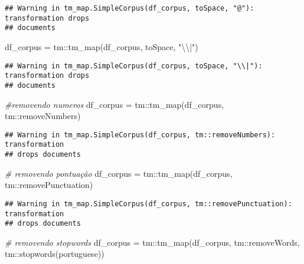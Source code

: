 \documentclass[
]{article}
\newenvironment{Shaded}{\begin{snugshade}}{\end{snugshade}}
\newcommand{\CommentTok}[1]{\textcolor[rgb]{0.56,0.35,0.01}{\textit{#1}}}
\newcommand{\FunctionTok}[1]{\textcolor[rgb]{0.00,0.00,0.00}{#1}}
\newcommand{\NormalTok}[1]{#1}
\newcommand{\OtherTok}[1]{\textcolor[rgb]{0.56,0.35,0.01}{#1}}
\newcommand{\SpecialCharTok}[1]{\textcolor[rgb]{0.00,0.00,0.00}{#1}}
\newcommand{\StringTok}[1]{\textcolor[rgb]{0.31,0.60,0.02}{#1}}
\begin{document}
\begin{verbatim}
## Warning in tm_map.SimpleCorpus(df_corpus, toSpace, "@"): transformation drops
## documents
\end{verbatim}

\begin{Shaded}
\begin{Highlighting}[]
\NormalTok{df\_corpus }\OtherTok{=}\NormalTok{ tm}\SpecialCharTok{::}\FunctionTok{tm\_map}\NormalTok{(df\_corpus, toSpace, }\StringTok{"}\SpecialCharTok{\textbackslash{}\textbackslash{}}\StringTok{|"}\NormalTok{)}
\end{Highlighting}
\end{Shaded}

\begin{verbatim}
## Warning in tm_map.SimpleCorpus(df_corpus, toSpace, "\\|"): transformation drops
## documents
\end{verbatim}

\begin{Shaded}
\begin{Highlighting}[]
\CommentTok{\#removendo numeros}
\NormalTok{df\_corpus }\OtherTok{=}\NormalTok{ tm}\SpecialCharTok{::}\FunctionTok{tm\_map}\NormalTok{(df\_corpus, tm}\SpecialCharTok{::}\NormalTok{removeNumbers)}
\end{Highlighting}
\end{Shaded}

\begin{verbatim}
## Warning in tm_map.SimpleCorpus(df_corpus, tm::removeNumbers): transformation
## drops documents
\end{verbatim}

\begin{Shaded}
\begin{Highlighting}[]
\CommentTok{\# removendo pontuação}
\NormalTok{df\_corpus }\OtherTok{=}\NormalTok{ tm}\SpecialCharTok{::}\FunctionTok{tm\_map}\NormalTok{(df\_corpus, tm}\SpecialCharTok{::}\NormalTok{removePunctuation)}
\end{Highlighting}
\end{Shaded}

\begin{verbatim}
## Warning in tm_map.SimpleCorpus(df_corpus, tm::removePunctuation): transformation
## drops documents
\end{verbatim}

\begin{Shaded}
\begin{Highlighting}[]
\CommentTok{\# removendo stopwords }
\NormalTok{df\_corpus }\OtherTok{=}\NormalTok{ tm}\SpecialCharTok{::}\FunctionTok{tm\_map}\NormalTok{(df\_corpus, tm}\SpecialCharTok{::}\NormalTok{removeWords, tm}\SpecialCharTok{::}\FunctionTok{stopwords}\NormalTok{(}\StringTok{\textquotesingle{}portuguese\textquotesingle{}}\NormalTok{))}
\end{Highlighting}
\end{Shaded}
\end{document}
